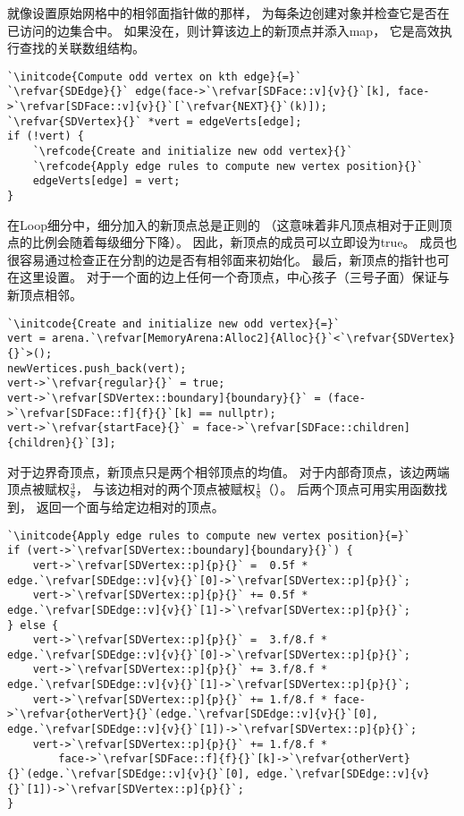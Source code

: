 就像设置原始网格中的相邻面指针做的那样，
为每条边创建对象并检查它是否在已访问的边集合中。
如果没在，则计算该边上的新顶点并添入{\ttfamily map}，
它是高效执行查找的关联数组结构。
\begin{lstlisting}
`\initcode{Compute odd vertex on kth edge}{=}`
`\refvar{SDEdge}{}` edge(face->`\refvar[SDFace::v]{v}{}`[k], face->`\refvar[SDFace::v]{v}{}`[`\refvar{NEXT}{}`(k)]);
`\refvar{SDVertex}{}` *vert = edgeVerts[edge];
if (!vert) {
    `\refcode{Create and initialize new odd vertex}{}`
    `\refcode{Apply edge rules to compute new vertex position}{}`
    edgeVerts[edge] = vert;
}
\end{lstlisting}

在Loop细分中，细分加入的新顶点总是正则的
（这意味着非凡顶点相对于正则顶点的比例会随着每级细分下降）。
因此，新顶点的成员可以立即设为{\ttfamily true}。
成员也很容易通过检查正在分割的边是否有相邻面来初始化。
最后，新顶点的指针也可在这里设置。
对于一个面的边上任何一个奇顶点，中心孩子（三号子面）保证与新顶点相邻。
\begin{lstlisting}
`\initcode{Create and initialize new odd vertex}{=}`
vert = arena.`\refvar[MemoryArena:Alloc2]{Alloc}{}`<`\refvar{SDVertex}{}`>();
newVertices.push_back(vert);
vert->`\refvar{regular}{}` = true;
vert->`\refvar[SDVertex::boundary]{boundary}{}` = (face->`\refvar[SDFace::f]{f}{}`[k] == nullptr);
vert->`\refvar{startFace}{}` = face->`\refvar[SDFace::children]{children}{}`[3];
\end{lstlisting}

对于边界奇顶点，新顶点只是两个相邻顶点的均值。
对于内部奇顶点，该边两端顶点被赋权$\displaystyle\frac{3}{8}$，
与该边相对的两个顶点被赋权$\displaystyle\frac{1}{8}$（）。
后两个顶点可用实用函数找到，
返回一个面与给定边相对的顶点。
\begin{lstlisting}
`\initcode{Apply edge rules to compute new vertex position}{=}`
if (vert->`\refvar[SDVertex::boundary]{boundary}{}`) {
    vert->`\refvar[SDVertex::p]{p}{}` =  0.5f * edge.`\refvar[SDEdge::v]{v}{}`[0]->`\refvar[SDVertex::p]{p}{}`;
    vert->`\refvar[SDVertex::p]{p}{}` += 0.5f * edge.`\refvar[SDEdge::v]{v}{}`[1]->`\refvar[SDVertex::p]{p}{}`;
} else {
    vert->`\refvar[SDVertex::p]{p}{}` =  3.f/8.f * edge.`\refvar[SDEdge::v]{v}{}`[0]->`\refvar[SDVertex::p]{p}{}`;
    vert->`\refvar[SDVertex::p]{p}{}` += 3.f/8.f * edge.`\refvar[SDEdge::v]{v}{}`[1]->`\refvar[SDVertex::p]{p}{}`;
    vert->`\refvar[SDVertex::p]{p}{}` += 1.f/8.f * face->`\refvar{otherVert}{}`(edge.`\refvar[SDEdge::v]{v}{}`[0], edge.`\refvar[SDEdge::v]{v}{}`[1])->`\refvar[SDVertex::p]{p}{}`;
    vert->`\refvar[SDVertex::p]{p}{}` += 1.f/8.f *
        face->`\refvar[SDFace::f]{f}{}`[k]->`\refvar{otherVert}{}`(edge.`\refvar[SDEdge::v]{v}{}`[0], edge.`\refvar[SDEdge::v]{v}{}`[1])->`\refvar[SDVertex::p]{p}{}`;
}
\end{lstlisting}

